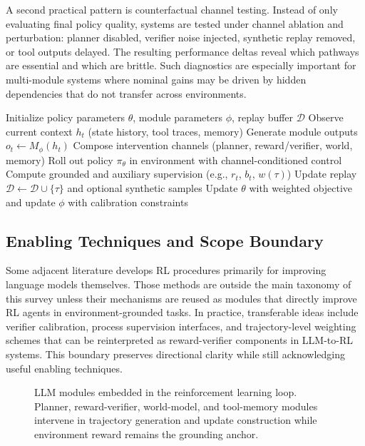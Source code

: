 ﻿\documentclass[conference]{IEEEtran}
\begin{document}
A second practical pattern is counterfactual channel testing. Instead of only evaluating final policy quality, systems are tested under channel ablation and perturbation: planner disabled, verifier noise injected, synthetic replay removed, or tool outputs delayed. The resulting performance deltas reveal which pathways are essential and which are brittle. Such diagnostics are especially important for multi-module systems where nominal gains may be driven by hidden dependencies that do not transfer across environments.

\begin{algorithm}[t]
\caption{Generic LLM-Enhanced RL Loop}
\label{alg:generic_loop}
\begin{algorithmic}[1]
\State Initialize policy parameters $\theta$, module parameters $\phi$, replay buffer $\mathcal{D}$
  \State Observe current context $h_t$ (state history, tool traces, memory)
  \State Generate module outputs $o_t \leftarrow M_{\phi}(h_t)$
  \State Compose intervention channels (planner, reward/verifier, world, memory)
  \State Roll out policy $\pi_{\theta}$ in environment with channel-conditioned control
  \State Compute grounded and auxiliary supervision (e.g., $r_t$, $b_t$, $w(\tau)$)
  \State Update replay $\mathcal{D}\leftarrow \mathcal{D}\cup \{\tau\}$ and optional synthetic samples
  \State Update $\theta$ with weighted objective and update $\phi$ with calibration constraints
\EndFor
\end{algorithmic}
\end{algorithm}

\subsection{Enabling Techniques and Scope Boundary}
Some adjacent literature develops RL procedures primarily for improving language models themselves. Those methods are outside the main taxonomy of this survey unless their mechanisms are reused as modules that directly improve RL agents in environment-grounded tasks. In practice, transferable ideas include verifier calibration, process supervision interfaces, and trajectory-level weighting schemes that can be reinterpreted as reward-verifier components in LLM-to-RL systems. This boundary preserves directional clarity while still acknowledging useful enabling techniques.

\begin{figure}[t]
\centering

\caption{LLM modules embedded in the reinforcement learning loop. Planner, reward-verifier, world-model, and tool-memory modules intervene in trajectory generation and update construction while environment reward remains the grounding anchor.}
\label{fig:loop}
\end{figure}
\end{document}
